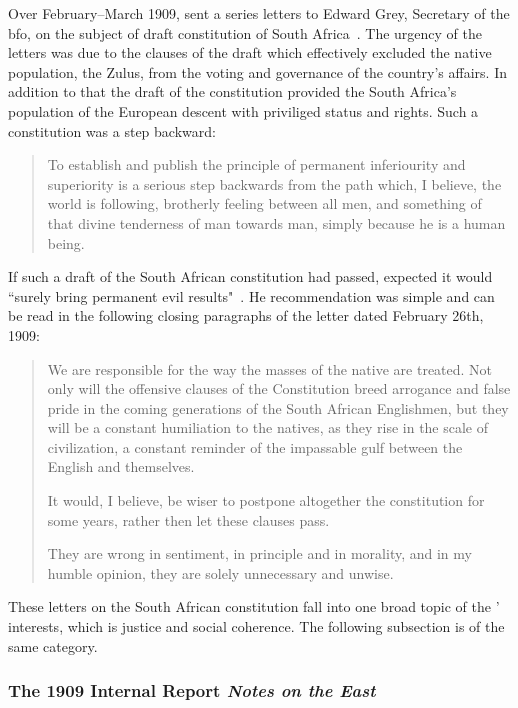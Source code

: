 Over February--March 1909, \citeauthor{innes1909_} sent a series letters to Edward Grey, Secretary of the \ac{bfo}, on the subject of draft constitution of South Africa~\citep{innes1909_}. The urgency of the letters was due to the clauses of the draft which effectively excluded the native population, the Zulus, from the voting and governance of the country's affairs. In addition to that the draft of the constitution provided the South Africa's population of the European descent with priviliged status and rights. Such a constitution was a step backward:

\begin{quote}
To establish and publish the principle of permanent inferiourity and superiority is a serious step backwards from the path which, I believe, the world is following, brotherly feeling between all men, and something of that divine tenderness of man towards man, simply because he is a human being.~\citep{innes1909_}
\end{quote}

If such a draft of the South African constitution had passed, \citeauthor{innes1909_} expected it would ``surely bring permanent evil results"~\citep{innes1909_}. He recommendation was simple and can be read in the following closing paragraphs of the letter dated February 26th, 1909:

\begin{quote}
We are responsible for the way the masses of the native are treated. Not only will the offensive clauses of the Constitution breed arrogance and false pride in the coming generations of the South African Englishmen, but they will be a constant humiliation to the natives, as they rise in the scale of civilization, a constant reminder of the impassable gulf between the English and themselves. \par It would, I believe, be wiser to postpone altogether the constitution for some years, rather then let these clauses pass. \par They are wrong in sentiment, in principle and in morality, and in my humble opinion, they are solely unnecessary and unwise.~\citep{innes1909_}
\end{quote}

These letters on the South African constitution fall into one broad topic of the \citeauthor{innes1909_}' interests, which is justice and social coherence. The following subsection is of the same category.

\subsubsection{The 1909 Internal Report \textit{Notes on the East}}\label{sec:innes1909}


